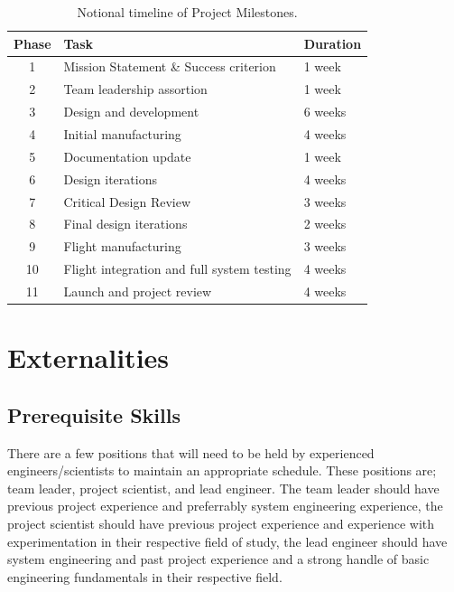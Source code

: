 \documentclass[conference]{IEEEtran} %
\begin{document}
\begin{table}[hb!]
    \caption{Notional timeline of Project Milestones.}
    \centering
    \begin{tabular}{@{}cll@{}}
    \toprule
    Phase & Task & Duration \\
    \midrule
    1 & Mission Statement \& Success criterion & 1 week \\
    2 & Team leadership assortion & 1 week \\
    3 & Design and development & 6 weeks \\
    4 & Initial manufacturing & 4 weeks \\
    5 & Documentation update & 1 week \\
    6 & Design iterations & 4 weeks \\
    7 & Critical Design Review & 3 weeks \\
    8 & Final design iterations & 2 weeks \\
    9 & Flight manufacturing & 3 weeks \\
    10 & Flight integration and full system testing & 4 weeks \\
    11 & Launch and project review & 4 weeks \\
    \bottomrule
    \end{tabular}
\label{tab:short-example}
\end{table}

\section{Externalities}
\subsection{Prerequisite Skills}
There are a few positions that will need to be held by experienced engineers/scientists to maintain an appropriate schedule. These positions are; team leader, project scientist, and lead 
engineer. The team leader should have previous project experience and preferrably system engineering experience, the project scientist should have previous project experience and experience with experimentation in their respective field 
of study, the lead engineer should have system engineering and past project experience and a strong handle of basic engineering fundamentals in their respective field. 
\end{document}
